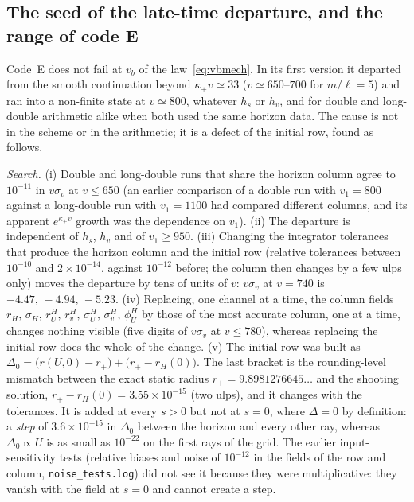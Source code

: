 \documentclass[11pt]{article}
\begin{document}
\subsection{The seed of the late-time departure, and the range of code E}
\label{sec:seed}

Code~E does not fail at $v_b$ of the law~\eqref{eq:vbmech}. In its first version it departed from the smooth continuation beyond $\kappa_+v\simeq33$ ($v\simeq650$--$700$ for $m/\ell=5$) and ran into a non-finite state at $v\simeq800$, whatever $h_s$ or $h_v$, and for double and long-double arithmetic alike when both used the same horizon data. The cause is not in the scheme or in the arithmetic; it is a defect of the initial row, found as follows.

\emph{Search.} (i) Double and long-double runs that share the horizon column agree to $10^{-11}$ in $v\sigma_v$ at $v\le650$ (an earlier comparison of a double run with $v_1=800$ against a long-double run with $v_1=1100$ had compared different columns, and its apparent $e^{\kappa_+v}$ growth was the dependence on $v_1$). (ii) The departure is independent of $h_s$, $h_v$ and of $v_1\ge950$. (iii) Changing the integrator tolerances that produce the horizon column and the initial row (relative tolerances between $10^{-10}$ and $2\times10^{-14}$, against $10^{-12}$ before; the column then changes by a few ulps only) moves the departure by tens of units of $v$: $v\sigma_v$ at $v=740$ is $-4.47,\,-4.94,\,-5.23$. (iv) Replacing, one channel at a time, the column fields $r_H,\,\sigma_H,\,r_U^{H},\,r_v^{H},\,\sigma_U^{H},\,\sigma_v^{H},\,\phi_U^{H}$ by those of the most accurate column, one at a time, changes nothing visible (five digits of $v\sigma_v$ at $v\le780$), whereas replacing the initial row does the whole of the change. (v) The initial row was built as $\Delta_0=\bigl(r(U,0)-r_+\bigr)+\bigl(r_+-r_H(0)\bigr)$. The last bracket is the rounding-level mismatch between the exact static radius $r_+=9.8981276645\ldots$ and the shooting solution, $r_+-r_H(0)=3.55\times10^{-15}$ (two ulps), and it changes with the tolerances. It is added at every $s>0$ but not at $s=0$, where $\Delta=0$ by definition: a \emph{step} of $3.6\times10^{-15}$ in $\Delta_0$ between the horizon and every other ray, whereas $\Delta_0\propto U$ is as small as $10^{-22}$ on the first rays of the grid. The earlier input-sensitivity tests (relative biases and noise of $10^{-12}$ in the fields of the row and column, \texttt{noise\_tests.log}) did not see it because they were multiplicative: they vanish with the field at $s=0$ and cannot create a step.
\end{document}

